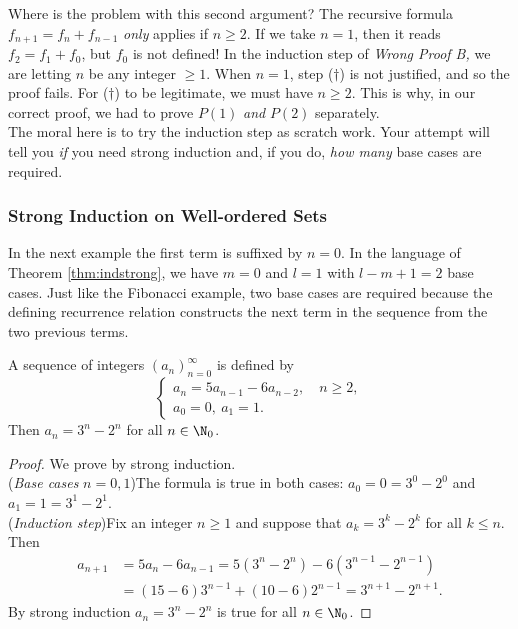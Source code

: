 \noindent Where is the problem with this second argument? The recursive formula $f_{n+1}=f_n+f_{n-1}$ \emph{only} applies if $n\ge 2$. If we take $n=1$, then it reads $f_2=f_1+f_0$, but $f_0$ is not defined! In the induction step of \emph{Wrong Proof B,} we are letting $n$ be any integer $\ge 1$. When $n=1$, step ($\dag$) is not justified, and so the proof fails. For ($\dag$) to be legitimate, we must have $n\ge 2$. This is why, in our correct proof, we had to prove $P(1)$ \emph{and} $P(2)$ separately.\\

\noindent The moral here is to try the induction step as scratch work. Your attempt will tell you \emph{if} you need strong induction and, if you do, \emph{how many} base cases are required.


\begin{nopgbreak}
\subsubsection*{Strong Induction on Well-ordered Sets}

In the next example the first term is suffixed by $n=0$. In the language of Theorem \ref{thm:indstrong}, we have $m=0$ and $l=1$ with $l-m+1=2$ base cases. Just like the Fibonacci example, two base cases are required because the defining recurrence relation constructs the next term in the sequence from the two previous terms.

\begin{thm}
A sequence of integers $(a_n)_{n=0}^\infty$ is defined by
\[\begin{cases}
a_n=5a_{n-1}-6a_{n-2},\quad n\ge 2,\\
a_0=0,\ a_1=1.
\end{cases}\]
Then $a_n=3^n-2^n$ for all $n\in\N_0$.
\end{thm}
\end{nopgbreak}

\begin{proof}
We prove by strong induction.\\[2pt]
(\emph{Base cases} $n=0,1$)\quad The formula is true in both cases: $a_0=0=3^0-2^0$ and $a_1=1=3^1-2^1$.\\[2pt]
(\emph{Induction step})\quad Fix an integer $n\ge 1$ and suppose that $a_k=3^k-2^k$ for all $k\le n$. Then
\begin{align*}
a_{n+1}&=5a_n-6a_{n-1}=5(3^n-2^n)-6(3^{n-1}-2^{n-1})\\
&=(15-6)3^{n-1}+(10-6)2^{n-1}=3^{n+1}-2^{n+1}.
\end{align*}
By strong induction $a_n=3^n-2^n$ is true for all $n\in\N_0$.
\end{proof}

